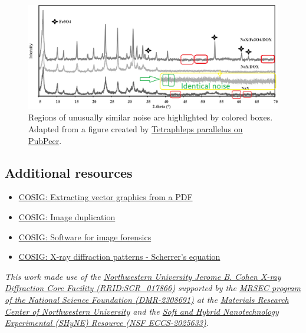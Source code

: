 \documentclass[letterpaper, 12pt]{article}
\begin{document}
\begin{figure}[h!tbp]
    \centering
    \includegraphics[width=\textwidth]{img/xrd_data_duplication/abasian_figure_1.png}
    \caption*{Regions of unusually similar noise are highlighted by colored boxes. Adapted from a figure created by \href{https://pubpeer.com/publications/DB4037BDC430AFA6C281842E945363\#1}{Tetraphleps parallelus on PubPeer}.}
\end{figure}

\subsection*{Additional resources}

\begin{itemize}
    \setlength\itemsep{-0.5em}
    \item \href{https://osf.io/n8fvw}{COSIG: Extracting vector graphics from a PDF}
    \item \href{https://osf.io/547re}{COSIG: Image duplication}
    \item \href{https://osf.io/g23pf}{COSIG: Software for image forensics}
    \item \href{https://osf.io/hf7qy}{COSIG: X-ray diffraction patterns - Scherrer's equation}
\end{itemize}

\textit{This work made use of the \href{http://xray.facilities.northwestern.edu/}{Northwestern University Jerome B. Cohen X-ray Diffraction Core Facility (RRID:SCR\_017866)} supported by the \href{https://www.nsf.gov/awardsearch/showAward?AWD_ID=2308691}{MRSEC program of the National Science Foundation (DMR-2308691)} at the \href{https://materials.northwestern.edu/}{Materials Research Center of Northwestern University} and the \href{https://shyne.northwestern.edu/}{Soft and Hybrid Nanotechnology Experimental (SHyNE) Resource (NSF ECCS-2025633)}.}
\end{document}

